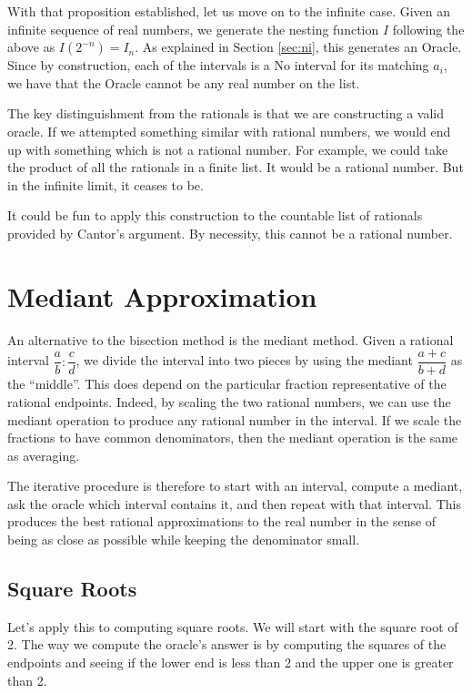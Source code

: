 \documentclass[12pt]{article}
\theoremstyle{remark}
\begin{document}
With that proposition established, let us move on to the infinite case. Given an infinite sequence of real numbers, we generate the nesting function $I$ following the above as $I(2^{-n}) = I_n$. As explained in Section \ref{sec:ni}, this generates an Oracle. Since by construction, each of the intervals is a No interval for its matching $a_i$, we have that the Oracle cannot be any real number on the list. 

The key distinguishment from the rationals is that we are constructing a valid oracle. If we attempted something similar with rational numbers, we would end up with something which is not a rational number. For example, we could take the product of all the rationals in a finite list. It would be a rational number. But in the infinite limit, it ceases to be. 

It could be fun to apply this construction to the countable list of rationals provided by Cantor's argument. By necessity, this cannot be a rational number. 




\section{Mediant Approximation}

An alternative to the bisection method is the mediant method. Given a rational interval $\dfrac{a}{b} : \dfrac{c}{d}$, we divide the interval into two pieces by using the mediant $\dfrac{a+c}{b+d}$ as the ``middle''. This does depend on the particular fraction representative of the rational endpoints. Indeed, by scaling the two rational numbers, we can use the mediant operation to produce any rational number in the interval. If we scale the fractions to have common denominators, then the mediant operation is the same as averaging.  

The iterative procedure is therefore to start with an interval, compute a mediant, ask the oracle which interval contains it, and then repeat with that interval. This produces the best rational approximations to the real number in the sense of being as close as possible while keeping the denominator small. 

\subsection{Square Roots}

Let's apply this to computing square roots. We will start with the square root of 2. The way we compute the oracle's answer is by computing the squares of the endpoints and seeing if the lower end is less than 2 and the upper one is greater than 2.
\end{document}
